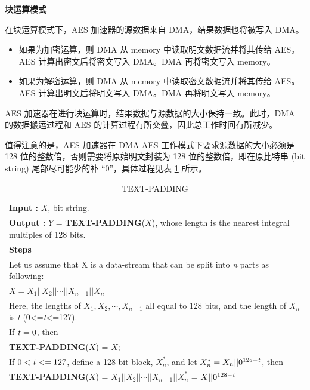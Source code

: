 \documentclass[main\_\_CN.tex]{subfiles}
\begin{document}
\textbf{块运算模式}

在块运算模式下，AES 加速器的源数据来自 DMA，结果数据也将被写入 DMA。
\begin{itemize}
    \item 如果为加密运算，则 DMA 从 memory 中读取明文数据流并将其传给 AES。AES 计算出密文后将密文写入 DMA。DMA 再将密文写入 memory。
    \item 如果为解密运算，则 DMA 从 memory 中读取密文数据流并将其传给 AES。AES 计算出明文后将明文写入 DMA。DMA 再将明文写入 memory。
\end{itemize}

AES 加速器在进行块运算时，结果数据与源数据的大小保持一致。此时，DMA 的数据搬运过程和 AES 的计算过程有所交叠，因此总工作时间有所减少。

\label{api:testpadding} 值得注意的是，AES 加速器在 DMA-AES 工作模式下要求源数据的大小必须是 128 位的整数倍，否则需要将原始明文封装为 128 位的整数倍，即在原比特串 (bit string) 尾部尽可能少的补 “0”，具体过程见表 \ref{tab:aes-define-func-text-padding} 所示。

\clearpage
\begin{longtable}[c]{|p{15cm}|}
\caption{TEXT-PADDING} 
\label{tab:aes-define-func-text-padding}\\
\hline
\rowcolor{lightgray}
\multirow{1}{*}{%
{\bfseries Function :} {\bfseries TEXT-PADDING}(\ ) } \\\hline
{\bfseries Input\phantom{aaa} :} $X$, bit string.\\
{\bfseries Output\phantom{a~} :} $Y$ = {\bfseries TEXT-PADDING}($X$), whose length is the nearest integral multiples of 128 bits. \\\hline
{\bfseries Steps\phantom{aa~}  }\\
\hspace{1.3cm} Let us assume that X is a data-stream that can be split into {\it{n}} parts as following: \\
\phantom{aaaaaaaa}$X = X_{1} || X_{2} || \cdots || X_{n-1} || X_{n}$ \\
\phantom{aaaaaaaa}Here, the lengths of $X_{1}, X_{2}, \cdots, X_{n-1}$ all equal to 128 bits, and the length of $X_{n}$ is {\it{t}} (0<={\it{t}}<=127).\\
\phantom{aaaaaaaa}If ${\it{t}} = 0$, then\\
\phantom{aaaaaaaa}\phantom{空空空空空} {\bfseries TEXT-PADDING}($X$) = $X$;\\
\phantom{aaaaaaaa}If $0<{\it{t}} <= 127$, define a 128-bit block, $X_{n}^{*}$, and let $X_{n}^{*} = X_{n} || 0^{128-{\it{t}}}$, then\\
\phantom{aaaaaaaa}\phantom{空空空空空} {\bfseries TEXT-PADDING}($X$) = $X_{1} || X_{2} || \cdots || X_{n-1} || X_{n}^{*}$  = $X || 0^{128-{\it{t}}}$\\
\hline
\end{longtable}
\end{document}
